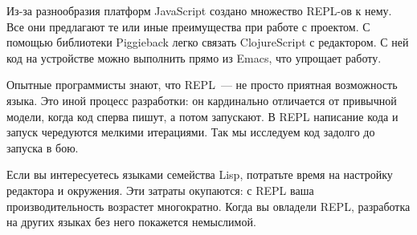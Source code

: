 Из-за разнообразия платформ JavaScript создано множество REPL-ов к нему. Все они предлагают те или иные преимущества при работе с проектом. С помощью библиотеки Piggieback легко связать ClojureScript с редактором. С ней код на устройстве можно выполнить прямо из Emacs, что упрощает работу.

Опытные программисты знают, что REPL~--- не просто приятная возможность языка. Это иной процесс разработки: он кардинально отличается от привычной модели, когда код сперва пишут, а потом запускают. В REPL написание кода и запуск чередуются мелкими итерациями. Так мы исследуем код задолго до запуска в бою.

Если вы интересуетесь языками семейства Lisp, потратьте время на настройку редактора и окружения. Эти затраты окупаются: с REPL ваша производительность возрастет многократно. Когда вы овладели REPL, разработка на других языках без него покажется немыслимой.
